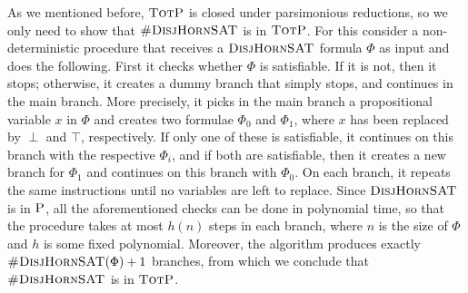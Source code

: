 %
%
As we mentioned before, $\text{\sc TotP}$ is closed under parsimonious reductions, so we only need to show that 
$\textsc{\#DisjHornSAT}$ is in $\text{\sc TotP}$. For this consider a non-deterministic procedure that receives a $\textsc{DisjHornSAT}$ formula $\Phi$ as input and does the following. First it checks whether $\Phi$ is satisfiable. If it is not, then it stops; otherwise, it creates a dummy branch that simply stops, and continues in the main branch. More precisely, it picks in the main branch a propositional variable $x$ in $\Phi$ and creates two formulae $\Phi_0$ and $\Phi_1$, where $x$ has been replaced by $\perp$ and $\top$, respectively. If only one of these is satisfiable, it continues on this branch with the respective $\Phi_i$, and if both are satisfiable, then it creates a new branch for $\Phi_1$ and continues on this branch with $\Phi_0$. On each branch, it repeats the same instructions until no variables are left to replace. Since $\textsc{DisjHornSAT}$ is in $\text{\sc P}$, all the aforementioned checks can be done in polynomial time, so that the procedure takes at most $h(n)$ steps in each branch, where $n$ is the size of $\Phi$ and $h$ is some fixed polynomial. Moreover, the algorithm produces exactly $\textsc{\#DisjHornSAT}(\Phi)+1$ branches, from which we conclude that $\textsc{\#DisjHornSAT}$ is in $\text{\sc TotP}$. 

